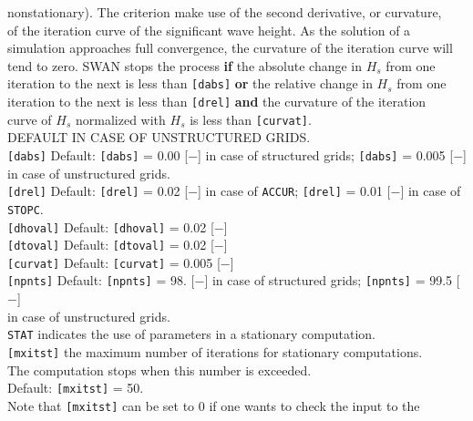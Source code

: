 \documentclass[12pt]{book}
\begin{document}
\begin{tabbing}
                  nonstationary). The criterion make use of the second derivative, or curvature,\\
                  of the iteration curve of the significant wave height. As the solution of a\\
                  simulation approaches full convergence, the curvature of the iteration curve will\\
                  tend to zero. SWAN stops the process {\bf if} the absolute change in $H_s$ from one\\
                  iteration to the next is less than {\tt [dabs]} {\bf or} the relative change in $H_s$ from one\\
                  iteration to the next is less than {\tt [drel]} {\bf and} the curvature of the iteration\\
                  curve of $H_s$ normalized with $H_s$ is less than {\tt [curvat]}.\\
                  DEFAULT IN CASE OF UNSTRUCTURED GRIDS.\-\\
{\tt [dabs]}   \> Default: {\tt [dabs]} = 0.00 [$-$] in case of structured grids; {\tt [dabs]} = 0.005 [$-$]\+\\
                  in case of unstructured grids.\-\\
{\tt [drel]}   \> Default: {\tt [drel]} = 0.02 [$-$] in case of {\tt ACCUR}; {\tt [drel]} = 0.01 [$-$] in case of {\tt STOPC}.\\
{\tt [dhoval]} \> Default: {\tt [dhoval]} = 0.02 [$-$]\\
{\tt [dtoval]} \> Default: {\tt [dtoval]} = 0.02 [$-$]\\
{\tt [curvat]} \> Default: {\tt [curvat]} = 0.005 [$-$]\\
{\tt [npnts]}  \> Default: {\tt [npnts]} = 98. [$-$] in case of structured grids; {\tt [npnts]} = 99.5 [$-$]\+\\
                  in case of unstructured grids.\-\\
{\tt STAT}     \> indicates the use of parameters in a stationary computation.\\
{\tt [mxitst]} \> the maximum number of iterations for stationary computations.\+\\
                  The computation stops when this number is exceeded.\\
                  Default: {\tt [mxitst]} = 50.\\
                  Note that {\tt [mxitst]} can be set to 0 if one wants to check the input to the\\

\end{tabbing}
\end{document}
